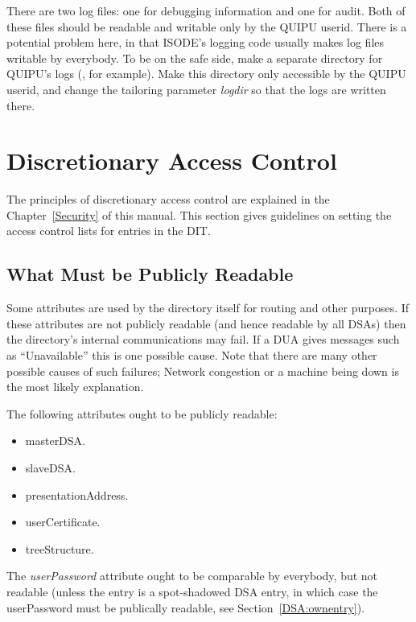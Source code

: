 There are two log files: one for debugging information and one for audit.
Both of these files should be readable and writable only by the QUIPU userid.
There is a potential problem here, in that ISODE's logging code usually makes
log files writable by everybody. To be on the safe side, make a separate
directory for QUIPU's logs (, for example). Make this
directory only accessible by the QUIPU userid, and change the tailoring
parameter {\em logdir} so that the logs are written there.

\section{Discretionary Access Control}

The principles of discretionary access control are explained in the
Chapter~\ref{Security} of this manual. This section 
gives guidelines on setting the access
control lists for entries in the DIT.

\subsection{What Must be Publicly Readable}

Some attributes are used by the directory itself for routing and other
purposes. If these attributes are not publicly readable (and hence readable
by all DSAs) then the directory's internal communications may fail. 
If a DUA gives messages such as ``Unavailable'' this is one possible cause.
Note that there are many other possible causes of such failures; Network
congestion or a machine being down is the most likely explanation.

The following attributes ought to be publicly readable:

\begin{itemize}
\item
masterDSA.
\item
slaveDSA.
\item
presentationAddress.
\item
userCertificate.
\item
treeStructure.
\end{itemize}

The {\em userPassword} attribute ought to be comparable by everybody, but not
readable (unless the entry is a spot-shadowed DSA entry, in which case
the userPassword must be publically readable, see Section~\ref{DSA:ownentry}).



